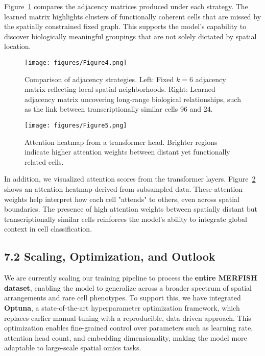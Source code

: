\documentclass[unnumsec,webpdf,contemporary,medium]{oup-authoring-template}
\begin{document}
Figure~\ref{fig:matrix-output} compares the adjacency matrices produced under each strategy. The learned matrix highlights clusters of functionally coherent cells that are missed by the spatially constrained fixed graph. This supports the model's capability to discover biologically meaningful groupings that are not solely dictated by spatial location.

\begin{figure}[H]
\centering
\texttt{[image: figures/Figure4.png]}
\caption{Comparison of adjacency strategies. Left: Fixed $k=6$ adjacency matrix reflecting local spatial neighborhoods. Right: Learned adjacency matrix uncovering long-range biological relationships, such as the link between transcriptionally similar cells 96 and 24.}
\label{fig:matrix-output}
\end{figure}
\vspace{1em}
\begin{figure}[H]
\centering
\texttt{[image: figures/Figure5.png]}
\caption{Attention heatmap from a transformer head. Brighter regions indicate higher attention weights between distant yet functionally related cells.}
\label{fig:attention-map}
\end{figure}

In addition, we visualized attention scores from the transformer layers. Figure~\ref{fig:attention-map} shows an attention heatmap derived from subsampled data. These attention weights help interpret how each cell "attends" to others, even across spatial boundaries. The presence of high attention weights between spatially distant but transcriptionally similar cells reinforces the model’s ability to integrate global context in cell classification.
\subsection*{7.2 Scaling, Optimization, and Outlook}

We are currently scaling our training pipeline to process the \textbf{entire MERFISH dataset}, enabling the model to generalize across a broader spectrum of spatial arrangements and rare cell phenotypes. To support this, we have integrated \textbf{Optuna}, a state-of-the-art hyperparameter optimization framework, which replaces earlier manual tuning with a reproducible, data-driven approach. This optimization enables fine-grained control over parameters such as learning rate, attention head count, and embedding dimensionality, making the model more adaptable to large-scale spatial omics tasks.
\end{document}
